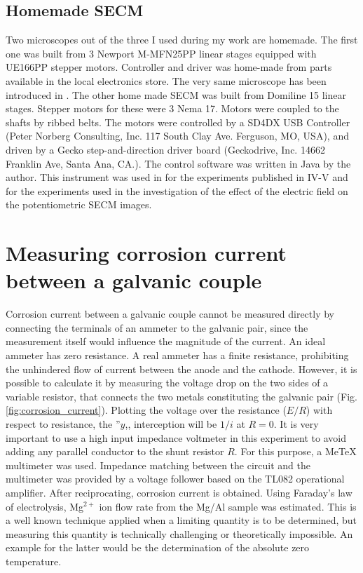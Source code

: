 		\subsection{Homemade SECM}
Two microscopes out of the three I used during my work are homemade.
The first one was built from 3 Newport M-MFN25PP linear stages equipped with UE166PP stepper motors. 
Controller and driver was home-made from parts available in the local electronics store.
The very same microscope has been introduced in \cite{kovacs1999automatic}.
The other home made SECM was built from Domiline 15 linear stages.
Stepper motors for these were 3 Nema 17.
Motors were coupled to the shafts by ribbed belts.
The motors were controlled by a SD4DX USB Controller (Peter Norberg Consulting, Inc. 117 South Clay Ave. Ferguson, MO, USA), and driven by a Gecko step-and-direction driver board (Geckodrive, Inc. 14662 Franklin Ave, Santa Ana, CA.).
The control software was written in Java by the author. 
This instrument was used in for the experiments published in IV-V and for the experiments used in the investigation of the effect of the electric field on the potentiometric SECM images.
	\section{Measuring corrosion current between a galvanic couple}
Corrosion current between a galvanic couple cannot be measured directly by connecting the terminals of an ammeter to the galvanic pair, since the measurement itself would influence the magnitude of the current.
An ideal ammeter has zero resistance.
A real ammeter has a finite resistance, prohibiting the unhindered flow of current between the anode and the cathode.
However, it is possible to calculate it by measuring the voltage drop on the two sides of a variable resistor, that connects the two metals constituting the galvanic pair (Fig. \ref{fig:corrosion_current}).
Plotting the voltage over the resistance ($E/R$) with respect to resistance, the ''$y$,, interception will be $1/i$ at $R=0$.
It is very important to use a high input impedance voltmeter in this experiment to avoid adding any parallel conductor to the shunt resistor $R$.
For this purpose, a MeTeX multimeter was used.
Impedance matching between the circuit and the multimeter was provided by a voltage follower based on the TL082 operational amplifier.
After reciprocating, corrosion current is obtained.
Using Faraday's law of electrolysis, Mg$^{2+}$ ion flow rate from the Mg/Al sample was estimated.
This is a well known technique applied when a limiting quantity is to be determined, but measuring this quantity is technically challenging or theoretically impossible.
An example for the latter would be the determination of the absolute zero temperature.

